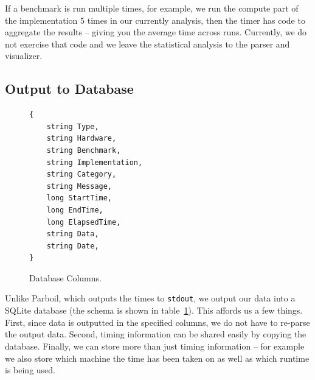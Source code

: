If a benchmark is run multiple times, for example, we run the compute part of
the implementation 5 times in our currently analysis, then the timer has code to
aggregate the results -- giving you the average time across runs.  Currently, we
do not exercise that code and we leave the statistical analysis to the parser
and visualizer.

\subsection*{Output to Database}


\begin{figure}[t!]
\begin{verbatim}
{
	string Type,
	string Hardware,
	string Benchmark,
	string Implementation,
	string Category,
	string Message,
	long StartTime,
	long EndTime,
	long ElapsedTime,
	string Data,
	string Date,
}
\end{verbatim}
\caption{Database Columns.}
\label{fig:database}
\centering
\end{figure}

Unlike Parboil, which outputs the times to {\tt stdout}, we output our data into
a SQLite database (the schema is shown in table~\ref{fig:database}).  This affords us a few things.  First, since data is outputted
in the specified columns, we do not have to re-parse the output data.  Second,
timing information can be shared easily by copying the database.  Finally, we
can store more than just timing information -- for example we also store which machine the time has been taken on as well as which runtime is being used.

